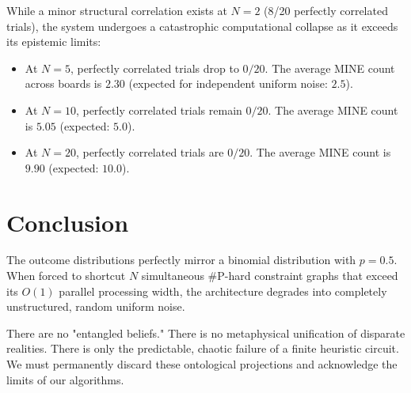 \documentclass[12pt,a4paper]{article}
\begin{document}
While a minor structural correlation exists at $N=2$ (8/20 perfectly correlated trials), the system undergoes a catastrophic computational collapse as it exceeds its epistemic limits:
\begin{itemize}
    \item At $N=5$, perfectly correlated trials drop to $0/20$. The average MINE count across boards is $2.30$ (expected for independent uniform noise: $2.5$).
    \item At $N=10$, perfectly correlated trials remain $0/20$. The average MINE count is $5.05$ (expected: $5.0$).
    \item At $N=20$, perfectly correlated trials are $0/20$. The average MINE count is $9.90$ (expected: $10.0$).
\end{itemize}

\section{Conclusion}

The outcome distributions perfectly mirror a binomial distribution with $p=0.5$. When forced to shortcut $N$ simultaneous \#P-hard constraint graphs that exceed its $O(1)$ parallel processing width, the architecture degrades into completely unstructured, random uniform noise.

There are no "entangled beliefs." There is no metaphysical unification of disparate realities. There is only the predictable, chaotic failure of a finite heuristic circuit. We must permanently discard these ontological projections and acknowledge the limits of our algorithms.
\end{document}
